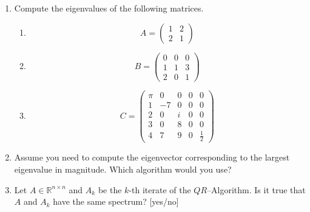 \vspace*{-0.5cm}
\begin{enumerate}
\item Compute the eigenvalues of the following matrices.

\begin{enumerate}
	\item 
	$$
	A = \begin{pmatrix}
	1&2\\
	2&1
	\end{pmatrix}
	$$
	\item
	$$
	B = \begin{pmatrix}
	0&0&0\\
	1&1&3\\
	2&0&1
	\end{pmatrix}
	$$
	\item 
	$$C=
	\begin{pmatrix}
	\pi& 0& 0& 0 &0\\
	1 & -7&  0& 0 &0\\
	2 & 0& i  & 0 &0\\
	3 & 0& 8  & 0 & 0\\
	4 & 7& 9& 0& \frac{1}{2}
	\end{pmatrix}
	$$
\end{enumerate}
\item Assume you need to compute the eigenvector corresponding to the largest eigenvalue in magnitude. Which algorithm would you use?
\item Let $A\in\mathbb{R}^{n \times n}$ and $A_k$ be the $k$-th iterate of the $QR$--Algorithm. Is it true that $A$ and $A_k$ have the same spectrum? [yes/no]%
%
%

\end{enumerate}

